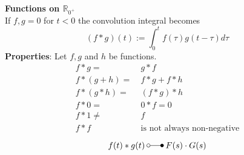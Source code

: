 \textbf{Functions on $\mathbb{R}_{0^+}$}\\
If $f,g=0$ for $t<0$ the convolution integral becomes
\begin{equation*}
    (f*g)(t):=\int_{0}^{t}f(\tau)g(t-\tau)d\tau
\end{equation*}
\textbf{Properties}: Let $f,g$ and $h$ be functions.
\begin{align*}
    f*g =     & \ g*f                               \\
    f*(g+h) = & \ f*g+f*h                           \\
    f*(g*h) = & \ (f*g)*h                           \\
    f*0 =     & \ 0*f=0                             \\
    f*1 \ne   & \ f                                 \\
    f*f \;    & \ \text{is not always non-negative}
\end{align*}
\begin{equation*}
    f(t)*g(t) \:\laplace\: F(s)\cdot G(s)
\end{equation*}
